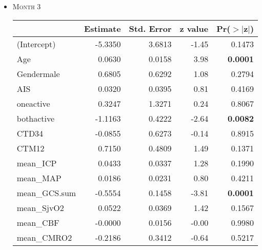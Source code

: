 \documentclass{article}
\begin{document}
\begin{itemize}
\item \textsc{Month 3}
\begin{table}[H]
\centering
\begin{tabular}{lrrrr}
  \hline
 & Estimate & Std. Error & z value & Pr($>$$|$z$|$) \\ 
  \hline
(Intercept) & -5.3350 & 3.6813 & -1.45 & 0.1473 \\ 
  Age & 0.0630 & 0.0158 & 3.98 & {\bf 0.0001} \\ 
  Gendermale & 0.6805 & 0.6292 & 1.08 & 0.2794 \\ 
  AIS & 0.0320 & 0.0395 & 0.81 & 0.4169 \\ 
  oneactive & 0.3247 & 1.3271 & 0.24 & 0.8067 \\ 
  bothactive & -1.1163 & 0.4222 & -2.64 & {\bf 0.0082} \\ 
  CTD34 & -0.0855 & 0.6273 & -0.14 & 0.8915 \\ 
  CTM12 & 0.7150 & 0.4809 & 1.49 & 0.1371 \\ 
  mean\_ICP & 0.0433 & 0.0337 & 1.28 & 0.1990 \\ 
  mean\_MAP & 0.0186 & 0.0231 & 0.80 & 0.4211 \\ 
  mean\_GCS.sum & -0.5554 & 0.1458 & -3.81 & {\bf 0.0001} \\ 
  mean\_SjvO2 & 0.0522 & 0.0369 & 1.42 & 0.1567 \\ 
  mean\_CBF & -0.0000 & 0.0156 & -0.00 & 0.9980 \\ 
  mean\_CMRO2 & -0.2186 & 0.3412 & -0.64 & 0.5217 \\ 
   \hline
\end{tabular}
\end{table}



\end{itemize}
\end{document}
